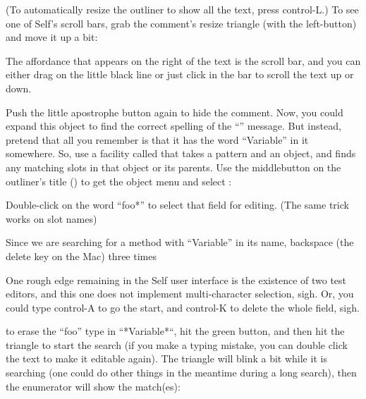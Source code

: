 \documentclass[letterpaper,10pt,english]{sphinxmanual}
\begin{document}
(To automatically resize the outliner to show all the text, press control-L.) To see one of Self’s
scroll bars, grab the comment’s resize triangle (with the left-button) and move it up a bit:
\begin{figure}[htbp]
\centering

\noindent{}
\end{figure}

The affordance that appears on the right of the text is the scroll bar, and you can either drag on the
little black line or just click in the bar to scroll the text up or down.

Push the little apostrophe button again to hide the comment. Now, you could expand this object to
find the correct spelling of the “” message. But instead, pretend that all you remember
is that it has the word “Variable” in it somewhere. So, use a facility called  that takes
a pattern and an object, and finds any matching slots in that object or its parents. Use the middlebutton
on the outliner’s title () to get the object menu and select :


Double-click on the word “foo*” to select that field for editing. (The same trick works on slot
names)


Since we are searching for a method with “Variable” in its name, backspace (the delete key on the
Mac) three times %
\begin{footnote}[7]\sphinxAtStartFootnote
One rough edge remaining in the Self user interface is the existence of two test editors, and this one does not implement multi-character selection, sigh. Or, you could type control-A to go the start, and control-K to delete the whole field, sigh.
%
\end{footnote} to erase the “foo” type in “*Variable*“, hit the green button, and then hit the
triangle to start the search (if you make a typing mistake, you can double click the text to make it
editable again). The triangle will blink a bit while it is searching (one could do other things in the
meantime during a long search), then the enumerator will show the match(es):
\end{document}
